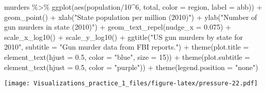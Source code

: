 \documentclass[
]{article}
\newenvironment{Shaded}{\begin{snugshade}}{\end{snugshade}}
\newcommand{\AttributeTok}[1]{\textcolor[rgb]{0.77,0.63,0.00}{#1}}
\newcommand{\DecValTok}[1]{\textcolor[rgb]{0.00,0.00,0.81}{#1}}
\newcommand{\FloatTok}[1]{\textcolor[rgb]{0.00,0.00,0.81}{#1}}
\newcommand{\FunctionTok}[1]{\textcolor[rgb]{0.00,0.00,0.00}{#1}}
\newcommand{\NormalTok}[1]{#1}
\newcommand{\SpecialCharTok}[1]{\textcolor[rgb]{0.00,0.00,0.00}{#1}}
\newcommand{\StringTok}[1]{\textcolor[rgb]{0.31,0.60,0.02}{#1}}
\begin{document}
\begin{Shaded}
\begin{Highlighting}[]
\NormalTok{murders }\SpecialCharTok{\%\textgreater{}\%} 
  \FunctionTok{ggplot}\NormalTok{(}\FunctionTok{aes}\NormalTok{(population}\SpecialCharTok{/}\DecValTok{10}\SpecialCharTok{\^{}}\DecValTok{6}\NormalTok{, total, }\AttributeTok{color =}\NormalTok{ region, }\AttributeTok{label =}\NormalTok{ abb)) }\SpecialCharTok{+}
  \FunctionTok{geom\_point}\NormalTok{() }\SpecialCharTok{+} \FunctionTok{xlab}\NormalTok{(}\StringTok{"State population per million (2010)"}\NormalTok{) }\SpecialCharTok{+} 
  \FunctionTok{ylab}\NormalTok{(}\StringTok{"Number of gun murders in state (2010)"}\NormalTok{) }\SpecialCharTok{+} 
  \FunctionTok{geom\_text\_repel}\NormalTok{(}\AttributeTok{nudge\_x =} \FloatTok{0.075}\NormalTok{) }\SpecialCharTok{+}
  \FunctionTok{scale\_x\_log10}\NormalTok{() }\SpecialCharTok{+} \FunctionTok{scale\_y\_log10}\NormalTok{() }\SpecialCharTok{+}
  \FunctionTok{ggtitle}\NormalTok{(}\StringTok{"US gun murders by state for 2010"}\NormalTok{, }
          \AttributeTok{subtitle =} \StringTok{"Gun murder data from FBI reports."}\NormalTok{) }\SpecialCharTok{+}
  \FunctionTok{theme}\NormalTok{(}\AttributeTok{plot.title =} \FunctionTok{element\_text}\NormalTok{(}\AttributeTok{hjust =} \FloatTok{0.5}\NormalTok{, }\AttributeTok{color =} \StringTok{"blue"}\NormalTok{, }\AttributeTok{size =} \DecValTok{15}\NormalTok{)) }\SpecialCharTok{+}
  \FunctionTok{theme}\NormalTok{(}\AttributeTok{plot.subtitle =} \FunctionTok{element\_text}\NormalTok{(}\AttributeTok{hjust =} \FloatTok{0.5}\NormalTok{, }\AttributeTok{color =} \StringTok{"purple"}\NormalTok{)) }\SpecialCharTok{+}
  \FunctionTok{theme}\NormalTok{(}\AttributeTok{legend.position =} \StringTok{"none"}\NormalTok{)}
\end{Highlighting}
\end{Shaded}

\texttt{[image: Visualizations\_practice\_1\_files/figure-latex/pressure-22.pdf]}
\end{document}
